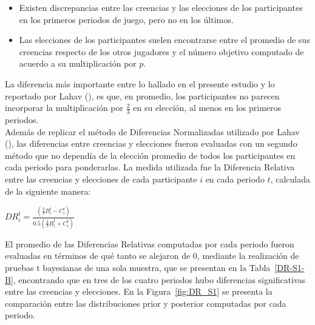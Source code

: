 \begin{itemize}
\item Existen discrepancias entre las creencias y las elecciones de los participantes en los primeros periodos de juego, pero no en los últimos.\\

\item Las elecciones de los participantes suelen encontrarse entre el promedio de sus creencias respecto de los otros jugadores y el número objetivo computado de acuerdo a su multiplicación por $p$.\\
\end{itemize}

La diferencia más importante entre lo hallado en el presente estudio y lo reportado por Lahav (\citeyear{Lahav}), es que, en promedio, los participantes no parecen incorporar la multiplicación por $\frac{2}{3}$ en su elección, al menos en los primeros periodos.\\

Además de replicar el método de Diferencias Normalizadas utilizado por Lahav (\citeyear{Lahav}), las diferencias entre creencias y elecciones fueron evaluadas con un segundo método que no dependía de la elección promedio de todos los participantes en cada periodo para ponderarlas. La medida utilizada fue la Diferencia Relativa entre las creencias y elecciones de cada participante $i$ en cada periodo $t$, calculada de la siguiente manera:\\

\begin{center}
$DR_i^t =  \frac{(\frac{2}{3}B_i^t- C_i^t)}{0.5(\frac{2}{3}B_i^t + C_i^t)}$\\
\end{center}

El promedio de las Diferencias Relativas computadas por cada periodo fueron evaluadas en términos de qué tanto se alejaron de 0, mediante la realización de pruebas t bayesianas de una sola muestra, que se presentan en la Tabla~\ref{DR-S1-B}, encontrando que en tres de los cuatro periodos hubo diferencias significativas entre las creencias y elecciones. En la Figura~\ref{fig:DR_S1} se presenta la comparación entre las distribuciones prior y posterior computadas por cada periodo.\\


